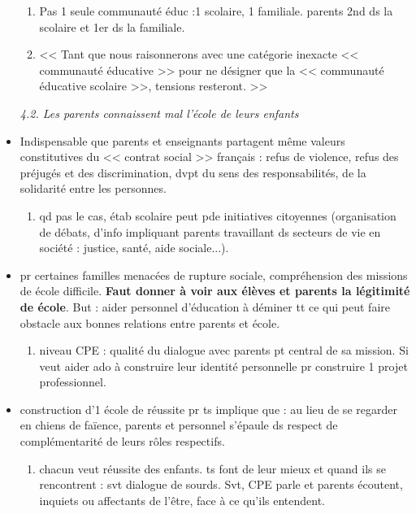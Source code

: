 \documentclass[12pt]{article}
\begin{document}
\begin{itemize}
{\begin{minipage}{19cm}
\begin{enumerate}
\item Pas 1 seule communauté éduc :1 scolaire, 1 familiale. parents 2nd ds la scolaire et 1er ds la familiale.\\
\item << Tant que nous raisonnerons avec une catégorie inexacte << communauté éducative >> pour ne désigner que la << communauté éducative scolaire >>, tensions resteront. >>
\end{enumerate}
\end{minipage}
}

\vspace{0.5cm}

\textit{4.2. Les parents connaissent mal l'école de leurs enfants} \\

\item Indispensable que parents et enseignants partagent même valeurs constitutives du << contrat social >> français : refus de violence, refus des préjugés et des discrimination, dvpt du sens des responsabilités, de la solidarité entre les personnes. \\
\begin{enumerate}
\item qd pas le cas, étab scolaire peut pde initiatives citoyennes (organisation de débats, d'info impliquant parents travaillant ds secteurs de vie en société : justice, santé, aide sociale...).
\end{enumerate}

\item pr certaines familles menacées de rupture sociale, compréhension des missions de école difficile. \textbf{Faut donner à voir aux élèves et parents la légitimité de école}. But : aider personnel d'éducation à déminer tt ce qui peut faire obstacle aux bonnes relations entre parents et école.\\
\begin{enumerate}
\item niveau CPE : qualité du dialogue avec parents pt central de sa mission. Si veut aider ado à construire leur identité personnelle pr construire 1 projet professionnel.\\
\end{enumerate}

\item construction d'1 école de réussite pr ts implique que : au lieu de se regarder en chiens de faïence, parents et personnel s'épaule ds respect de complémentarité de leurs rôles respectifs.\\ 
\begin{enumerate}
\item chacun veut réussite des enfants. ts font de leur mieux et quand ils se rencontrent : svt dialogue de sourds. Svt, CPE parle et parents écoutent, inquiets ou affectants de l'être, face à ce qu'ils entendent.\\
 \end{enumerate}


\end{itemize}
\end{document}
